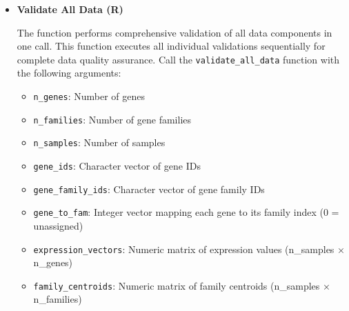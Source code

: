 \begin{enumerate}
\begin{itemize}
\begin{itemize}
                    \item \texttt{n\_strings}: Number of genes
                  \end{itemize}
                  
                  \begin{lstlisting}[language=R, caption={R Validate String Array Uniqueness}]
validate_string_array_uniqueness(string_arr, n_strings)
                  \end{lstlisting}
                  
            \item \textbf{Validate All Data (R)}
                  
                  The function performs comprehensive validation of all data components in one
                  call. This function executes all individual validations sequentially for
                  complete data quality assurance. Call the \texttt{validate\_all\_data}
                  function with the following arguments:
                  
                  \begin{itemize}
                    \item \texttt{n\_genes}: Number of genes
                          
                    \item \texttt{n\_families}: Number of gene families
                          
                    \item \texttt{n\_samples}: Number of samples
                          
                    \item \texttt{gene\_ids}: Character vector of gene IDs
                          
                    \item \texttt{gene\_family\_ids}: Character vector of gene family IDs
                          
                    \item \texttt{gene\_to\_fam}: Integer vector mapping each gene to its family
                          index (0 = unassigned)
                          
                    \item \texttt{expression\_vectors}: Numeric matrix of expression values (n\_samples
                          × n\_genes)
                          
                    \item \texttt{family\_centroids}: Numeric matrix of family centroids (n\_samples
                          × n\_families)
                          

\end{itemize}
\end{itemize}
\end{enumerate}
